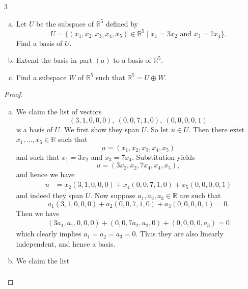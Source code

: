 \documentclass{extarticle}
\newenvironment{problem}[1]{\begin{prob*}{#1}{}}{\end{prob*}}
\newcommand{\R}{\mathbb{R}}
\begin{document}
\begin{problem}{3}
\begin{enumerate}[(a)]
\item Let $U$ be the subspace of $\R^5$ defined by
\begin{equation*}
U = \{(x_1,x_2,x_3,x_4,x_5)\in \R^5\mid x_1=3x_2\text{ and }x_3= 7x_4\}.
\end{equation*}
Find a basis of $U$.
\item Extend the basis in part $(a)$ to a basis of $\R^5$.
\item Find a subspace $W$ of $\R^5$ such that $\R^5=U\oplus W$.
\end{enumerate}
\end{problem}
\begin{proof}
\begin{enumerate}[(a)]
\item We claim the list of vectors
\begin{equation*}
(3, 1, 0, 0, 0), ~ (0, 0, 7, 1, 0), ~ (0, 0, 0, 0, 1)
\end{equation*}
is a basis of $U$.  We first show they span $U$.  So let $u\in U$.  Then there exist $x_1,\dots,x_5\in\R$ such that
\begin{equation*}
u = (x_1, x_2, x_3, x_4, x_5)
\end{equation*}
and such that $x_1=3x_2$ and $x_3 = 7x_4$.  Substitution yields
\begin{equation*}
u = (3x_2, x_2, 7x_4, x_4, x_5),
\end{equation*}
and hence we have
\begin{align*}
u &= x_2(3, 1, 0, 0, 0) + x_4(0, 0, 7, 1, 0) + x_5 (0, 0, 0, 0, 1)
\end{align*}
and indeed they span $U$.  Now suppose $a_1, a_2, a_3\in\R$ are such that 
\begin{equation*}
a_1(3, 1, 0, 0, 0) + a_2(0, 0, 7, 1, 0) + a_3(0, 0, 0, 0, 1) = 0.
\end{equation*}
Then we have
\begin{align*}
(3a_1, a_1, 0, 0, 0) + (0, 0, 7a_2, a_2, 0) + (0, 0, 0, 0, a_3) = 0
\end{align*}
which clearly implies $a_1=a_2=a_3 =0$.  Thus they are also linearly independent, and hence a basis.
\item We claim the list 
\begin{align*}

\end{align*}
\end{enumerate}
\end{proof}
\end{document}
